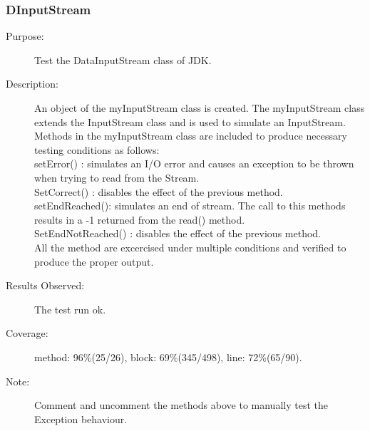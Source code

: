 \subsubsection{DInputStream}
\begin{description}
   \item[Purpose:]
Test the DataInputStream class of JDK.
    \item[Description:]
An object of the myInputStream class is created. The myInputStream
class extends the InputStream class and is used to simulate an
InputStream. Methods in the myInputStream
class are included to produce necessary testing conditions as follows:\\
\textbullet setError() : simulates an I/O error
and causes an exception to be thrown when trying to read from the Stream.\\
\textbullet SetCorrect() : disables the effect of the previous method.\\
\textbullet setEndReached(): simulates an end of
stream. The call to this methods results in a -1 returned from the read() method.\\
\textbullet SetEndNotReached() : disables the effect of the previous method.\\

All the method are excercised under multiple conditions and verified
to produce the proper output.
    \item[Results Observed:]
    The test run ok.
    \item[Coverage:]
    method: 96\%(25/26), block: 69\%(345/498), line: 72\%(65/90).
    \item[Note:]
    Comment and uncomment the methods above to manually test the Exception behaviour.
\end{description}

